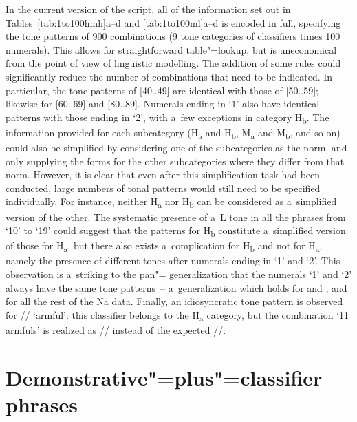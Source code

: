 In the current version of the script, all of the information set out in Tables~\ref{tab:1to100hmh}a--d and \ref{tab:1to100ml}a--d is encoded in full,
specifying the tone patterns of 900 combinations (9 tone categories of classifiers times 100
numerals). This allows for straightforward table"=lookup, but is uneconomical from the point of view
of linguistic modelling. The addition of some rules could significantly reduce the number of
combinations that need to be indicated. In particular, the tone patterns of [40..49] are identical
with those of [50..59]; likewise for [60..69] and [80..89]. Numerals ending in ‘1’ also have
identical patterns with those ending in ‘2’, with a~few exceptions in category H\textsubscript{b}. The information
provided for each subcategory (H\textsubscript{a} and H\textsubscript{b}, M\textsubscript{a} and M\textsubscript{b}, and so on) could also be simplified by
considering one of the subcategories as the norm, and only supplying the forms for the other
subcategories where they differ from that norm.
However, it is clear that even after this {simplification} task had been conducted, large numbers of
tonal patterns would still need to be specified individually. For instance, neither H\textsubscript{a} nor H\textsubscript{b} can be
considered as a~simplified version of the other. The systematic presence of a~L tone in all the phrases from ‘10’ to ‘19’ could suggest that the patterns for H\textsubscript{b} constitute a~simplified version of those for H\textsubscript{a}, but there also exists a~complication for H\textsubscript{b} and
not for H\textsubscript{a}, namely the presence of different tones after numerals ending in ‘1’ and ‘2’. This observation is a~striking  to the pan"= generalization that
the numerals ‘1’ and ‘2’ always have the same tone patterns~-- a~generalization which holds for 
and , and for all the rest of the Na data. Finally, an idiosyncratic tone pattern is observed for // ‘armful’: this classifier belongs to the H\textsubscript{a} category, but the combination ‘11 armfuls’ is realized as
// instead of the expected //.


\section{Demonstrative"=plus"=classifier phrases}
\label{sec:demonstrativeplusclassifierphrases}

